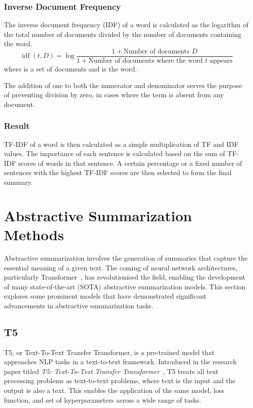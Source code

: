 \documentclass[english, ba, kiv, he, iso690numb, pdf, viewonly]{fasthesis}
\begin{document}
\subsubsection{Inverse Document Frequency}
The inverse document frequency (IDF) of a word is calculated as the logarithm of the total number of documents divided by the number of documents containing the word.
$$
\operatorname{idf}(t, D)=\log \frac{1 + \text{Number of documents } D}{1 + \text{Number of documents where the word } t \text{ appears}}
$$
where  is a set of documents and  is the word.

The addition of one to both the numerator and denominator serves the purpose of preventing division by zero, in cases where the term  is absent from any document.

\subsubsection{Result}
TF-IDF of a word  is then calculated as a simple multiplication of TF and IDF values. 
The importance of each sentence is calculated based on the sum of TF-IDF scores of words in that sentence. A certain percentage or a fixed number of sentences with the highest TF-IDF scores are then selected to form the final summary.

\section{Abstractive Summarization Methods}
Abstractive summarization involves the generation of summaries that capture the essential meaning of a given text. The coming of neural network architectures, particularly Transformer~\cite{vaswani2023attention}, has revolutionised the field, enabling the development of many state-of-the-art (SOTA) abstractive summarization models. This section explores some prominent models that have demonstrated significant advancements in abstractive summarization tasks.

\subsection{T5} \label{subsec:T5}
T5, or Text-To-Text Transfer Transformer, is a pre-trained model that approaches NLP tasks in a text-to-text framework. Introduced in the research paper titled \textit{T5: Text-To-Text Transfer Transformer}~\cite{2020t5}, T5 treats all text processing problems as text-to-text problems, where text is the input and the output is also a text. This enables the application of the same model, loss function, and set of hyperparameters across a wide range of tasks. 
\end{document}

